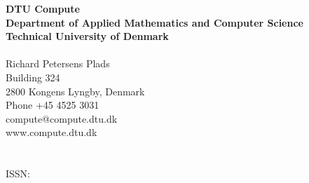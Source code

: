 \thispagestyle{empty} %
\frieze
\vspace*{\fill}
\noindent
\sffamily
\scriptsize
\textbf{DTU Compute}\\
\textbf{Department of Applied Mathematics and Computer Science}\\
\textbf{Technical University of Denmark}\\
\\
Richard Petersens Plads\\
Building 324\\
2800 Kongens Lyngby, Denmark\\
Phone +45 4525 3031\\
compute@compute.dtu.dk\\
www.compute.dtu.dk\\
\\
\thesisnumber{}\\
ISSN: \thesisISSN{}\\
\normalsize
\normalfont
\vspace*{0.5cm}
